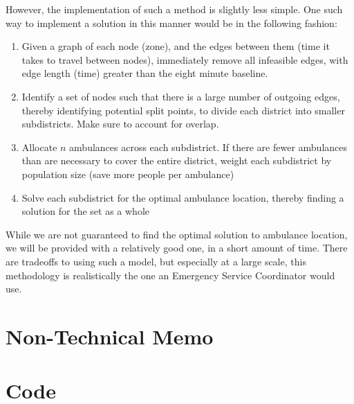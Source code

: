 \documentclass[notitlepage, 12pt]{article}
\begin{document}
However, the implementation of such a method is slightly less simple. One such way to implement a solution in this manner would be in the following fashion:

\begin{enumerate}
\item Given a graph of each node (zone), and the edges between them (time it takes to travel between nodes), immediately remove all infeasible edges, with edge length (time) greater than the eight minute baseline.

\item Identify a set of nodes such that there is a large number of outgoing edges, thereby identifying potential split points, to divide each district into smaller subdistricts. Make sure to account for overlap.

\item Allocate $n$ ambulances across each subdistrict. If there are fewer ambulances than are necessary to cover the entire district, weight each subdistrict by population size (save more people per ambulance)

\item Solve each subdistrict for the optimal ambulance location, thereby finding a solution for the set as a whole
\end{enumerate}

While we are not guaranteed to find the optimal solution to ambulance location, we will be provided with a relatively good one, in a short amount of time. There are tradeoffs to using such a model, but especially at a large scale, this methodology is realistically the one an Emergency Service Coordinator would use.

\section{Non-Technical Memo}

\appendix
\section{Code}







\end{document}
